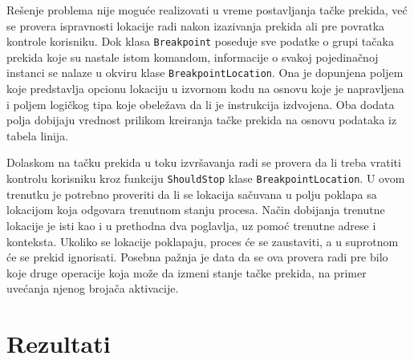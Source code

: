\documentclass[12pt,oneside]{memoir}
\begin{document}
Rešenje problema nije moguće realizovati u vreme postavljanja tačke prekida, već se provera ispravnosti lokacije radi nakon izazivanja prekida ali pre povratka kontrole korisniku.
Dok klasa \verb|Breakpoint| poseduje sve podatke o grupi tačaka prekida koje su nastale istom komandom, informacije o svakoj pojedinačnoj instanci se nalaze u okviru klase \verb|BreakpointLocation|.
Ona je dopunjena poljem koje predstavlja opcionu lokaciju u izvornom kodu na osnovu koje je napravljena i poljem logičkog tipa koje obeležava da li je instrukcija izdvojena.
Oba dodata polja dobijaju vrednost prilikom kreiranja tačke prekida na osnovu podataka iz tabela linija.

Dolaskom na tačku prekida u toku izvršavanja radi se provera da li treba vratiti kontrolu korisniku kroz funkciju \verb|ShouldStop| klase \verb|BreakpointLocation|.
U ovom trenutku je potrebno proveriti da li se lokacija sačuvana u polju poklapa sa lokacijom koja odgovara trenutnom stanju procesa.
Način dobijanja trenutne lokacije je isti kao i u prethodna dva poglavlja, uz pomoć trenutne adrese i konteksta.
Ukoliko se lokacije poklapaju, proces će se zaustaviti, a u suprotnom će se prekid ignorisati.
Posebna pažnja je data da se ova provera radi pre bilo koje druge operacije koja može da izmeni stanje tačke prekida, na primer uvećanja njenog brojača aktivacije.

\chapter{Rezultati}
\label{sec:results}
\end{document}
